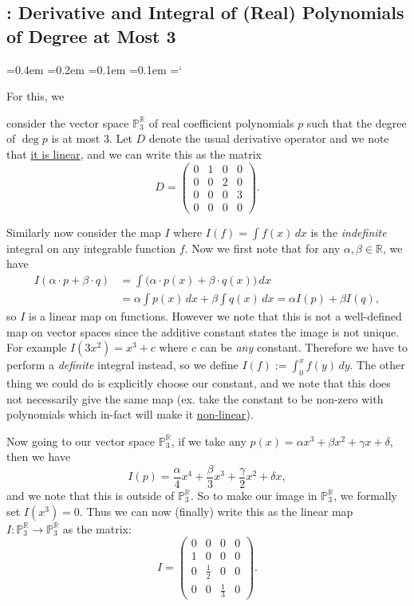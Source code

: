 
\subsection{\linTransTitle: Derivative and Integral of (Real) Polynomials of Degree at Most 3}

{\ttfamily
{}\font=0.4em
\font=0.2em
\font=0.1em
\font=0.1em
\hyphenchar\font=`\-


\hypertarget{scripts_linear_transformations_deriv_int}{For this, we} consider the vector space $\mathbb{P}^{\mathbb{R}}_3$ of real coefficient polynomials $p$ such that the degree of $\deg{p}$ is at most 3. Let $D$ denote the usual derivative operator and we note that \hyperlink{derivative_linear}{it is linear}, and we can write this as the matrix
\[
D = \begin{pmatrix}
0 & 1 & 0 & 0 \\
0 & 0 & 2 & 0 \\
0 & 0 & 0 & 3 \\
0 & 0 & 0 & 0
\end{pmatrix}.
\]

Similarly now consider the map $I$ where $I(f) = \int f(x) \, dx$ is the \emph{indefinite} integral on any integrable function $f$. Now we first note that for any $\alpha, \beta \in \mathbb{R}$, we have
\begin{align*}
I(\alpha \cdot p + \beta \cdot q) & = \int \bigl( \alpha \cdot p(x) + \beta \cdot q(x) \bigr) \, dx
\\ & = \alpha \int p(x) \, dx + \beta \int q(x) \, dx = \alpha I(p) + \beta I(q),
\end{align*}
so $I$ is a linear map on functions. However we note that this is not a well-defined map on vector spaces since the additive constant states the image is not unique. For example $I(3x^2) = x^3 + c$ where $c$ can be \emph{any} constant. Therefore we have to perform a \emph{definite} integral instead, so we define $I(f) := \int_0^x f(y) \, dy$. The other thing we could do is explicitly choose our constant, and we note that this does not necessarily give the same map (ex. take the constant to be non-zero with polynomials which in-fact will make it \hyperlink{non_linear_example}{non-linear}).

Now going to our vector space $\mathbb{P}^{\mathbb{R}}_3$, if we take any $p(x) = \alpha x^3 + \beta x^2 + \gamma x + \delta$, then we have
\[
I(p) = \frac{\alpha}{4} x^4 + \frac{\beta}{3} x^3 + \frac{\gamma}{2} x^2 + \delta x,
\]
and we note that this is outside of $\mathbb{P}^{\mathbb{R}}_3$. So to make our image in $\mathbb{P}^{\mathbb{R}}_3$, we formally set $I(x^3) = 0$. Thus we can now (finally) write this as the linear map $I \colon \mathbb{P}^{\mathbb{R}}_3 \rightarrow \mathbb{P}^{\mathbb{R}}_3$ as the matrix:
\[
I = \begin{pmatrix}
0 & 0 & 0 & 0 \\
1 & 0 & 0 & 0 \\
0 & \frac{1}{2} & 0 & 0 \\
0 & 0 & \frac{1}{3} & 0
\end{pmatrix}.
\]

}
